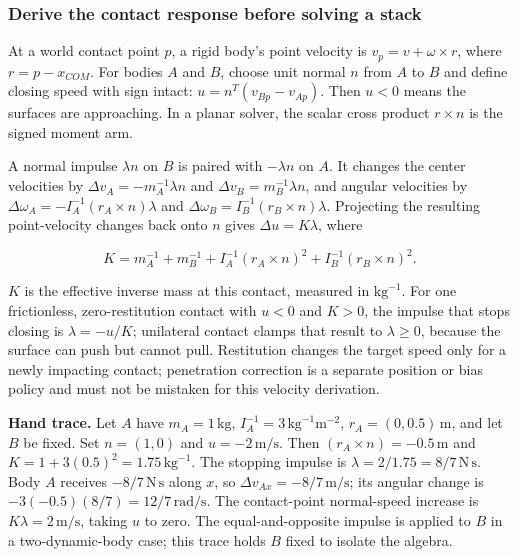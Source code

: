 \subsubsection{Derive the contact response before solving a stack}\label{06-engine-ii-ch034-derive-the-contact-response-before-solving-a-stack}

At a world contact point \(p\), a rigid body's point velocity is \(v_p=v+\omega\times r\), where \(r=p-x_{COM}\). For bodies \(A\) and \(B\), choose unit normal \(n\) from \(A\) to \(B\) and define closing speed with sign intact: \(u=n^T(v_{Bp}-v_{Ap})\). Then \(u<0\) means the surfaces are approaching. In a planar solver, the scalar cross product \(r\times n\) is the signed moment arm.

A normal impulse \(\lambda n\) on \(B\) is paired with \(-\lambda n\) on \(A\). It changes the center velocities by \(\Delta v_A=-m_A^{-1}\lambda n\) and \(\Delta v_B=m_B^{-1}\lambda n\), and angular velocities by \(\Delta\omega_A=-I_A^{-1}(r_A\times n)\lambda\) and \(\Delta\omega_B=I_B^{-1}(r_B\times n)\lambda\). Projecting the resulting point-velocity changes back onto \(n\) gives \(\Delta u=K\lambda\), where

\[
K=m_A^{-1}+m_B^{-1}+I_A^{-1}(r_A\times n)^2+I_B^{-1}(r_B\times n)^2.
\]

\(K\) is the effective inverse mass at this contact, measured in \(\mathrm{kg}^{-1}\). For one frictionless, zero-restitution contact with \(u<0\) and \(K>0\), the impulse that stops closing is \(\lambda=-u/K\); unilateral contact clamps that result to \(\lambda\ge0\), because the surface can push but cannot pull. Restitution changes the target speed only for a newly impacting contact; penetration correction is a separate position or bias policy and must not be mistaken for this velocity derivation.

\textbf{Hand trace.} Let \(A\) have \(m_A=1\,\mathrm{kg}\), \(I_A^{-1}=3\,\mathrm{kg}^{-1}\mathrm m^{-2}\), \(r_A=(0,0.5)\,\mathrm m\), and let \(B\) be fixed. Set \(n=(1,0)\) and \(u=-2\,\mathrm{m/s}\). Then \((r_A\times n)=-0.5\,\mathrm m\) and \(K=1+3(0.5)^2=1.75\,\mathrm{kg}^{-1}\). The stopping impulse is \(\lambda=2/1.75=8/7\,\mathrm{N\,s}\). Body \(A\) receives \(-8/7\,\mathrm{N\,s}\) along \(x\), so \(\Delta v_{Ax}=-8/7\,\mathrm{m/s}\); its angular change is \(-3(-0.5)(8/7)=12/7\,\mathrm{rad/s}\). The contact-point normal-speed increase is \(K\lambda=2\,\mathrm{m/s}\), taking \(u\) to zero. The equal-and-opposite impulse is applied to \(B\) in a two-dynamic-body case; this trace holds \(B\) fixed to isolate the algebra.

